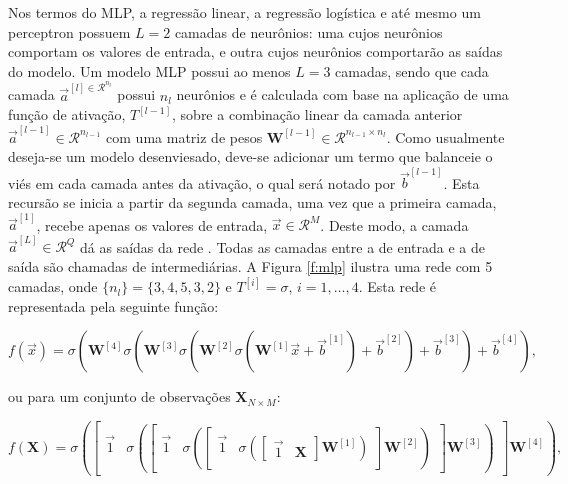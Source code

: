     Nos termos do MLP, a regressão linear, a regressão logística e até mesmo um perceptron possuem $L=2$ camadas de neurônios: uma cujos neurônios comportam os valores de entrada, e outra cujos neurônios comportarão as saídas do modelo. Um modelo MLP possui ao menos $L=3$ camadas, sendo que cada camada $\vec{a}^{[l] \in \mathcal{R}^{n_l}}$ possui $n_l$ neurônios e é calculada com base na aplicação de uma função de ativação, $T^{[l-1]}$, sobre a combinação linear da camada anterior $\vec{a}^{[l-1]} \in \mathcal{R}^{n_{l-1}}$ com uma matriz de pesos $\boldsymbol{W}^{[l-1]} \in \mathcal{R}^{n_{l-1}\times n_l}$. Como usualmente deseja-se um modelo desenviesado, deve-se adicionar um termo que balanceie o viés em cada camada antes da ativação, o qual será notado por $\vec{b}^{[l-1]}$. Esta recursão se inicia a partir da segunda camada, uma vez que a primeira camada, $\vec{a}^{[1]}$, recebe apenas os valores de entrada, $\vec{x} \in \mathcal{R}^{M}$. Deste modo, a camada $\vec{a}^{[L]} \in \mathcal{R}^{Q}$ dá as saídas da rede . Todas as camadas entre a de entrada e a de saída são chamadas de intermediárias. A Figura \ref{f:mlp} ilustra uma rede com 5 camadas, onde $\{n_l\} = \{3,4,5,3,2\}$ e $T^{[i]}=\sigma$, $i=1,\ldots,4$. Esta rede é representada pela seguinte função:

    \begin{equation} \label{e:mlp_exemplo}
      f(\vec{x}) =
      \sigma(
        \boldsymbol{W}^{[4]} \sigma(
          \boldsymbol{W}^{[3]} \sigma(
            \boldsymbol{W}^{[2]} \sigma(
              \boldsymbol{W}^{[1]}
                \vec{x}
              + {\vec{b}^{[1]}})
            + {\vec{b}^{[2]}})
          + {\vec{b}^{[3]}})
        + {\vec{b}^{[4]}})
      ,
    \end{equation}

    \noindent ou para um conjunto de observações $\boldsymbol{X}_{N\times M}$:

    \begin{equation} \label{e:mlp_exemplo_muitas_obs}
      f(\boldsymbol{X}) =
      \sigma\left(
        \begin{bmatrix} \vec{1} & \sigma\left(
          \begin{bmatrix} \vec{1} & \sigma\left(
            \begin{bmatrix} \vec{1} & \sigma\left(
              \begin{bmatrix} \vec{1} & \boldsymbol{X} \end{bmatrix}
            \boldsymbol{W}^{[1]}\right) \end{bmatrix}
          \boldsymbol{W}^{[2]}\right) \end{bmatrix}
        \boldsymbol{W}^{[3]}\right) \end{bmatrix}
      \boldsymbol{W}^{[4]}\right)
      ,
    \end{equation}

